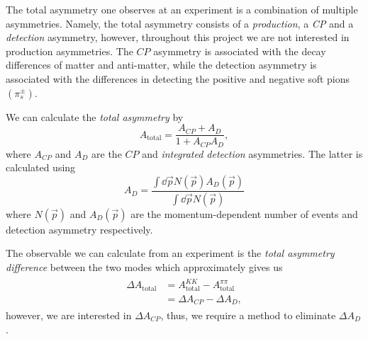 \documentclass{article}
\begin{document}
        The total asymmetry one observes at an experiment is a combination of multiple asymmetries.
        Namely, the total asymmetry consists of a \textit{production}, a \textit{CP} and a \textit{detection} asymmetry, however, throughout this project we are not interested in production asymmetries.
        The $CP$ asymmetry is associated with the decay differences of matter and anti-matter, while the detection asymmetry is associated with the differences in detecting the positive and negative soft pions $(\pi_s^\pm)$.
        
        We can calculate the \textit{total asymmetry} by
        \begin{equation}
                A_\text{total} = \frac{A_{CP} + A_D}{1 + A_{CP}A_D},
        \end{equation}
        where $A_{CP}$ and $A_D$ are the $CP$ and \textit{integrated detection} asymmetries.
        The latter is calculated using
        \begin{equation}
                A_D = \frac{\int \dd \vec{p} N(\vec{p})A_D(\vec{p})}{\int \dd \vec{p} N(\vec{p})}
        \end{equation}
        where $N(\vec{p})$ and $A_D(\vec{p})$ are the momentum-dependent number of events and detection asymmetry respectively.

        The observable we can calculate from an experiment is the \textit{total asymmetry difference} between the two modes which approximately gives us
        \begin{eqnarray}
                \begin{split}
                        \Delta A_\text{total} & = A^{KK}_\text{total} - A^{\pi\pi}_\text{total}\\
                        & = \Delta A_{CP} - \Delta A_D,
                \end{split}
        \end{eqnarray}
        however, we are interested in $\Delta A_{CP}$, thus, we require a method to eliminate $\Delta A_D$.
\end{document}
